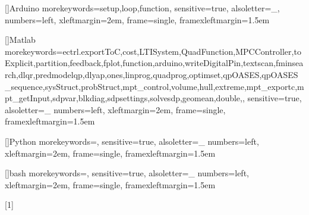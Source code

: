 []{Arduino}      %
{morekeywords={setup,loop,function},
sensitive=true,
alsoletter={_},
numbers=left,
xleftmargin=2em,
frame=single,
framexleftmargin=1.5em
}

[]{Matlab}      {morekeywords={ectrl.exportToC,cost,LTISystem,QuadFunction,MPCController,toExplicit,partition,feedback,fplot,function,arduino,writeDigitalPin,textscan,fminsearch,dlqr,predmodelqp,dlyap,ones,linprog,quadprog,optimset,qpOASES,qpOASES_sequence,sysStruct,probStruct,mpt_control,volume,hull,extreme,mpt_exportc,mpt_getInput,sdpvar,blkdiag,sdpsettings,solvesdp,geomean,double,},
sensitive=true,
alsoletter={_}
numbers=left,
xleftmargin=2em,
frame=single,
framexleftmargin=1.5em
}

[]{Python}
{morekeywords={},
sensitive=true,
alsoletter={_}
numbers=left,
xleftmargin=2em,
frame=single,
framexleftmargin=1.5em}

[]{bash}
{morekeywords={},
sensitive=true,
alsoletter={_}
numbers=left,
xleftmargin=2em,
frame=single,
framexleftmargin=1.5em}





[1]{
\lstset{
language=myArduino,
caption=#1,
label=#1,
style=customc}
}
{
}

{
}

